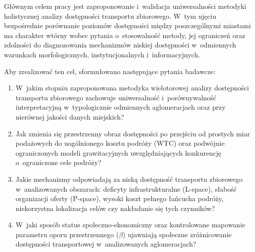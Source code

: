 \documentclass{pracamgr}
\begin{document}
Głównym celem pracy jest zaproponowanie i~walidacja uniwersalności metodyki holistycznej analizy dostępności transportu zbiorowego. W~tym ujęciu bezpośrednie porównanie poziomów dostępności między poszczególnymi miastami ma charakter wtórny wobec pytania o~stosowalność metody, jej ograniczeń oraz zdolności do diagnozowania mechanizmów niskiej dostępności w~odmiennych warunkach morfologicznych, instytucjonalnych i~informacyjnych.

Aby zrealizować ten cel, sformułowano następujące pytania badawcze:
\begin{enumerate}
    \item W~jakim stopniu zaproponowana metodyka wielotorowej analizy dostępności transportu zbiorowego zachowuje uniwersalność i~porównywalność interpretacyjną w~typologicznie odmiennych aglomeracjach oraz przy nierównej jakości danych miejskich?

    \item Jak zmienia się przestrzenny obraz dostępności po przejściu od prostych miar podażowych do uogólnionego kosztu podróży (WTC) oraz podwójnie ograniczonych modeli grawitacyjnych uwzględniających konkurencję o~ograniczone cele podróży?

    \item Jakie mechanizmy odpowiadają za niską dostępność transportu zbiorowego w~analizowanych obszarach: deficyty infrastrukturalne \mbox{(L-space)}, słabość organizacji oferty \mbox{(P-space)}, wysoki koszt pełnego łańcucha podróży, niekorzystna lokalizacja celów czy nakładanie się tych czynników?

    \item W~jaki sposób status społeczno-ekonomiczny oraz kontrolowane mapowanie parametru oporu przestrzennego ($\beta$) ujawniają społeczne zróżnicowanie dostępności transportowej w~analizowanych aglomeracjach?
\end{enumerate}
\end{document}

